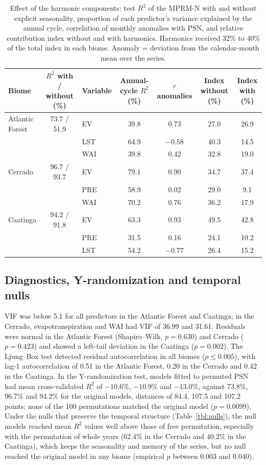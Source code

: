 \documentclass[a4paper,fleqn]{cas-sc}
\begin{document}
\begin{table}[htbp]
\caption{Effect of the harmonic components: test $R^2$ of the MPRM-N with and without explicit seasonality, proportion of each predictor's variance explained by the annual cycle, correlation of monthly anomalies with PSN, and relative contribution index without and with harmonics. Harmonics received 32\% to 40\% of the total index in each biome. Anomaly = deviation from the calendar-month mean over the series.}\label{tbl:harm}
\scriptsize
\begin{tabular*}{\tblwidth}{@{}LCLCCCC@{}}
\toprule
Biome & $R^2$ with / without (\%) & Variable & Annual-cycle $R^2$ (\%) & $r$ anomalies & Index without (\%) & Index with (\%) \\
\midrule
Atlantic Forest & 73.7 / 51.9 & EV & 39.8 & 0.73 & 27.0 & 26.9 \\
 & & LST & 64.9 & $-$0.58 & 40.3 & 14.5 \\
 & & WAI & 39.8 & 0.42 & 32.8 & 19.0 \\
Cerrado & 96.7 / 93.7 & EV & 79.1 & 0.90 & 34.7 & 37.4 \\
 & & PRE & 58.9 & 0.02 & 29.0 & 9.1 \\
 & & WAI & 70.2 & 0.76 & 36.2 & 17.9 \\
Caatinga & 94.2 / 91.8 & EV & 63.3 & 0.93 & 49.5 & 42.8 \\
 & & PRE & 31.5 & 0.16 & 24.1 & 10.2 \\
 & & LST & 54.2 & $-$0.77 & 26.4 & 15.2 \\
\bottomrule
\end{tabular*}
\end{table}

\subsection{Diagnostics, Y-randomization and temporal nulls}

VIF was below 5.1 for all predictors in the Atlantic Forest and Caatinga; in the Cerrado, evapotranspiration and WAI had VIF of 36.99 and 31.61. Residuals were normal in the Atlantic Forest (Shapiro--Wilk, $p = 0.630$) and Cerrado ($p = 0.423$) and showed a left-tail deviation in the Caatinga ($p = 0.002$). The Ljung--Box test detected residual autocorrelation in all biomes ($p \le 0.005$), with lag-1 autocorrelation of 0.51 in the Atlantic Forest, 0.20 in the Cerrado and 0.42 in the Caatinga. In the Y-randomization test, models fitted to permuted PSN had mean cross-validated $R^2$ of $-10.6\%$, $-10.9\%$ and $-13.0\%$, against 73.8\%, 96.7\% and 94.2\% for the original models, distances of 84.4, 107.5 and 107.2 points; none of the 100 permutations matched the original model ($p = 0.0099$). Under the nulls that preserve the temporal structure (Table~\ref{tbl:nulls}), the null models reached mean $R^2$ values well above those of free permutation, especially with the permutation of whole years (62.4\% in the Cerrado and 40.2\% in the Caatinga), which keeps the seasonality and memory of the series, but no null reached the original model in any biome (empirical $p$ between 0.003 and 0.040).
\end{document}

